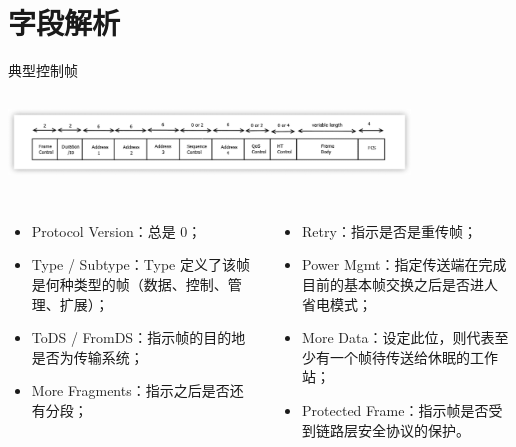 \documentclass[aspectratio=169]{beamer}
\begin{document}
    \section{字段解析}
    \begin{frame}{典型控制帧}
      \begin{columns}[onlytextwidth]
      \includegraphics[width=0.8\textwidth]{resources/典型控制帧 1.png}
      \end{columns}
      \begin{columns}[onlytextwidth]
          \begin{itemize}
           \item Protocol Version：总是 0；
           \item Type / Subtype：Type 定义了该帧是何种类型的帧（数据、控制、管理、扩展）；
           \item ToDS / FromDS：指⽰帧的⽬的地是否为传输系统；
           \item More Fragments：指⽰之后是否还有分段；
          \end{itemize}
          \begin{itemize}
            \item Retry：指⽰是否是重传帧；
            \item Power Mgmt：指定传送端在完成⽬前的基本帧交换之后是否进⼈省电模式；
            \item More Data：设定此位，则代表⾄少有⼀个帧待传送给休眠的⼯作站；
            \item Protected Frame：指⽰帧是否受到链路层安全协议的保护。
          \end{itemize}
      \end{columns}
      \justifying
  \end{frame}
\end{document}

